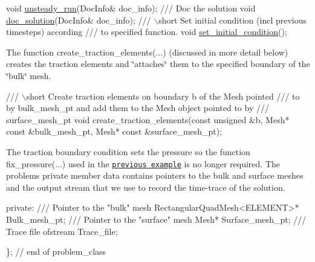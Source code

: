\begin{DoxyCodeInclude}
\textcolor{comment}{} \textcolor{keywordtype}{void} \hyperlink{classRayleighTractionProblem_a50871474406082ae1c1a1694e69e094b}{unsteady\_run}(DocInfo& doc\_info); 
 \textcolor{comment}{}
\textcolor{comment}{ /// Doc the solution}
\textcolor{comment}{} \textcolor{keywordtype}{void} \hyperlink{classRayleighTractionProblem_a451af703b4a6de97b060884ca71c3ef8}{doc\_solution}(DocInfo& doc\_info);
\textcolor{comment}{}
\textcolor{comment}{ /// \(\backslash\)short Set initial condition (incl previous timesteps) according}
\textcolor{comment}{ /// to specified function. }
\textcolor{comment}{} \textcolor{keywordtype}{void} \hyperlink{classRayleighTractionProblem_ad6394f146505e00aeba2fc37f2c75488}{set\_initial\_condition}();

\end{DoxyCodeInclude}


The function {\ttfamily create\+\_\+traction\+\_\+elements}(...) (discussed in more detail below) creates the traction elements and \char`\"{}attaches\char`\"{} them to the specified boundary of the \char`\"{}bulk\char`\"{} mesh.


\begin{DoxyCodeInclude}
\textcolor{comment}{}
\textcolor{comment}{ /// \(\backslash\)short Create traction elements on boundary b of the Mesh pointed}
\textcolor{comment}{ /// to by bulk\_mesh\_pt and add them to the Mesh object pointed to by }
\textcolor{comment}{ /// surface\_mesh\_pt}
\textcolor{comment}{} \textcolor{keywordtype}{void} create\_traction\_elements(\textcolor{keyword}{const} \textcolor{keywordtype}{unsigned} &b, 
                               Mesh* \textcolor{keyword}{const} &bulk\_mesh\_pt,
                               Mesh* \textcolor{keyword}{const} &surface\_mesh\_pt);

\end{DoxyCodeInclude}


The traction boundary condition sets the pressure so the function {\ttfamily fix\+\_\+pressure}(...) used in the \href{../../rayleigh_channel/html/index.html}{\tt previous example} is no longer required. The problem\textquotesingle{}s private member data contains pointers to the bulk and surface meshes and the output stream that we use to record the time-\/trace of the solution.


\begin{DoxyCodeInclude}

\textcolor{keyword}{private}:
\textcolor{comment}{}
\textcolor{comment}{ /// Pointer to the "bulk" mesh}
\textcolor{comment}{} RectangularQuadMesh<ELEMENT>* Bulk\_mesh\_pt;
 \textcolor{comment}{}
\textcolor{comment}{ /// Pointer to the "surface" mesh}
\textcolor{comment}{} Mesh* Surface\_mesh\_pt;
\textcolor{comment}{}
\textcolor{comment}{ /// Trace file}
\textcolor{comment}{} ofstream Trace\_file;

\}; \textcolor{comment}{// end of problem\_class}

\end{DoxyCodeInclude}





